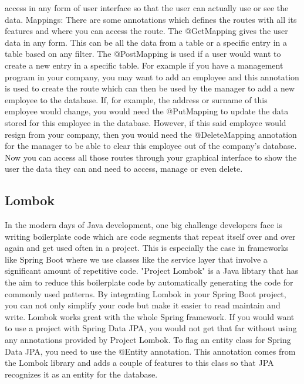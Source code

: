     access in any form of user interface so that the user can actually use or see the data.
    Mappings:
    There are some annotations which defines the routes with all its features and where you can access the route. The @GetMapping gives the user data in any form. This can be all the data from a table or a specific entry in a table based on any filter. The @PostMapping is used if a user would want to create a new entry in a specific table. 
    For example if you have a management program in your company, you may want to add an employee and this annotation is used to create the route which can then be used by the manager to add a new employee to the database. If, for example, the address or surname of this employee would change, you would need the @PutMapping to update
    the data stored for this employee in the database. However, if this said employee would resign from your company, then you would need the @DeleteMapping annotation for the manager to be able to clear this employee out of the company's database.
    Now you can access all those routes through your graphical interface to show the user the data they can and need to access, manage or even delete.
    
    
    \subsection{Lombok}
    In the modern days of Java development, one big challenge developers face is writing boilerplate code which are code segments that repeat itself over and over again and get used often in a project. This is especially the case in frameworks like Spring Boot where we use classes like the service layer that involve a significant amount of repetitive code.
    "Project Lombok" is a Java libtary that has the aim to reduce this boilerplate code by automatically generating the code for commonly used patterns. By integrating Lombok in your Spring Boot project, you can not only simplify your code but make it easier to read maintain and write. 
    Lombok works great with the whole Spring framework. If you would want to use a project with Spring Data JPA, you would not get that far without using any annotations provided by Project Lombok. To flag an entity class for Spring Data JPA, you need to use the @Entity annotation. This annotation comes from the Lombok library and adds a couple of 
    features to this class so that JPA recognizes it as an entity for the database.
    

